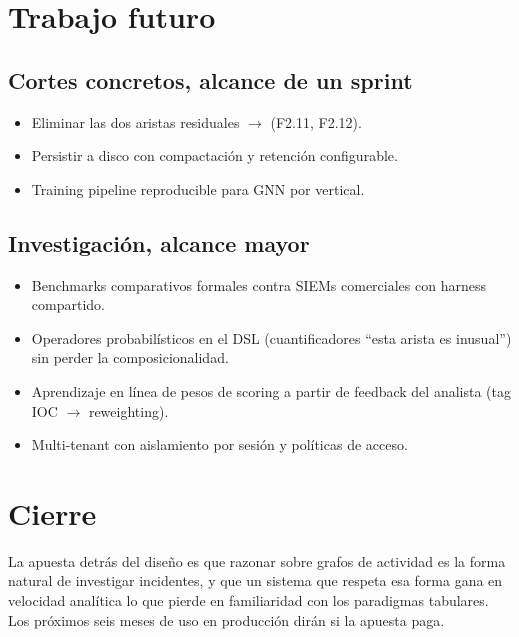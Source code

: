\section{Trabajo futuro}

\subsection*{Cortes concretos, alcance de un sprint}

\begin{itemize}
    \item Eliminar las dos aristas residuales
    $\to$ (F2.11, F2.12).
    \item Persistir  a disco con
    compactación y retención configurable.
    \item Training pipeline reproducible para GNN por vertical.
\end{itemize}

\subsection*{Investigación, alcance mayor}

\begin{itemize}
    \item Benchmarks comparativos formales contra SIEMs comerciales
    con harness compartido.
    \item Operadores probabilísticos en el DSL (cuantificadores
    ``esta arista es inusual'') sin perder la composicionalidad.
    \item Aprendizaje en línea de pesos de scoring a partir de
    feedback del analista (tag IOC $\to$ reweighting).
    \item Multi-tenant con aislamiento por sesión y políticas de
    acceso.
\end{itemize}

\section{Cierre}

La apuesta detrás del diseño es que razonar sobre grafos de
actividad es la forma natural de investigar incidentes, y que un
sistema que respeta esa forma gana en velocidad analítica lo que
pierde en familiaridad con los paradigmas tabulares. Los
próximos seis meses de uso en producción dirán si la apuesta
paga.
